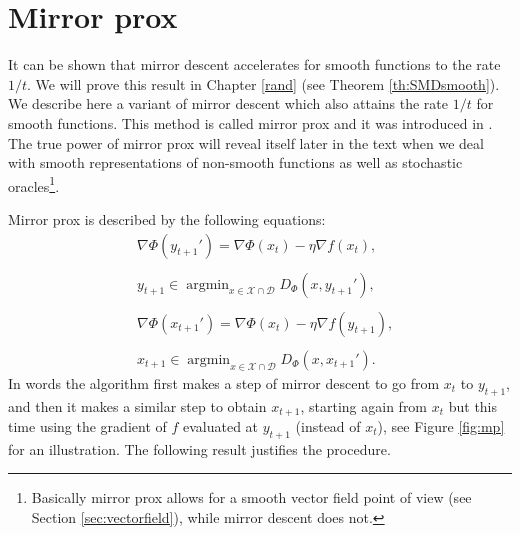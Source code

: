 \documentclass[openany]{now}
\newcommand{\argmin}{\mathop{\mathrm{argmin}}}
\begin{document}
\section{Mirror prox}
It can be shown that mirror descent accelerates for smooth functions to the rate $1/t$. We will prove this result in Chapter \ref{rand} (see Theorem \ref{th:SMDsmooth}). We describe here a variant of mirror descent which also attains the rate $1/t$ for smooth functions. This method is called mirror prox and it was introduced in \cite{Nem04}. 
The true power of mirror prox will reveal itself later in the text when we deal with smooth representations of non-smooth functions as well as stochastic oracles\footnote{Basically mirror prox allows for a smooth vector field point of view (see Section \ref{sec:vectorfield}), while mirror descent does not.}.

Mirror prox is described by the following equations:
\begin{align*}
& \nabla \Phi(y_{t+1}') = \nabla \Phi(x_{t}) - \eta \nabla f(x_t), \\ \\
& y_{t+1} \in \argmin_{x \in \mathcal{X} \cap \mathcal{D}} D_{\Phi}(x,y_{t+1}') , \\  \\
& \nabla \Phi(x_{t+1}') = \nabla \Phi(x_{t}) - \eta \nabla f(y_{t+1}), \\ \\
& x_{t+1} \in \argmin_{x \in \mathcal{X} \cap \mathcal{D}} D_{\Phi}(x,x_{t+1}') .
\end{align*}
In words the algorithm first makes a step of mirror descent to go from $x_t$ to $y_{t+1}$, and then it makes a similar step to obtain $x_{t+1}$, starting again from $x_t$ but this time using the gradient of $f$ evaluated at $y_{t+1}$ (instead of $x_t$), see Figure \ref{fig:mp} for an illustration. The following result justifies the procedure.
\end{document}
